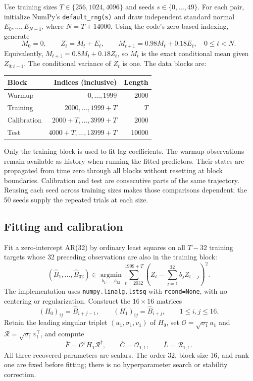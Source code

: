 \documentclass[11pt,twoside]{article}
\theoremstyle{definition}
\theoremstyle{remark}
\begin{document}
Use training sizes \(T\in\{256,1024,4096\}\) and seeds
\(s\in\{0,\ldots,49\}\). For each pair, initialize NumPy's
\texttt{default\_rng(s)} and draw independent standard normal
\(E_0,\ldots,E_{N-1}\), where \(N=T+14000\).
Using the code's zero-based indexing, generate
\[
 M_0=0,\qquad Z_t=M_t+E_t,\qquad
 M_{t+1}=0.98M_t+0.18E_t,\quad 0\le t<N.
\]
Equivalently, \(M_{t+1}=0.8M_t+0.18Z_t\), so \(M_t\) is the
exact conditional mean given \(Z_{0:t-1}\). The conditional variance
of \(Z_t\) is one. The data blocks are:
\begin{center}
\begin{tabular}{lrr}
\toprule
Block & Indices (inclusive) & Length\\
\midrule
Warmup & \(0,\ldots,1999\) & 2000\\
Training & \(2000,\ldots,1999+T\) & \(T\)\\
Calibration & \(2000+T,\ldots,3999+T\) & 2000\\
Test & \(4000+T,\ldots,13999+T\) & 10000\\
\bottomrule
\end{tabular}
\end{center}
Only the training block is used to fit lag coefficients. The warmup
observations remain available as history when running the fitted
predictors. Their states are propagated from time zero through all
blocks without resetting at block boundaries. Calibration and test
are consecutive parts of the same trajectory. Reusing each seed across
training sizes makes those comparisons dependent; the 50 seeds supply
the repeated trials at each size.

\subsection{Fitting and calibration}

Fit a zero-intercept AR(32) by ordinary least squares on all \(T-32\)
training targets whose 32 preceding observations are also in the training
block:
\[
 (\widehat B_1,\ldots,\widehat B_{32})
 \in\operatorname*{argmin}_{b_1,\ldots,b_{32}}
 \sum_{t=2032}^{1999+T}
 \left(Z_t-\sum_{j=1}^{32}b_jZ_{t-j}\right)^2.
\]
The implementation uses \texttt{numpy.linalg.lstsq} with
\texttt{rcond=None}, with no centering or regularization.
Construct the \(16\times16\) matrices
\[
 (H_0)_{ij}=\widehat B_{i+j-1},\qquad
 (H_1)_{ij}=\widehat B_{i+j},\qquad 1\le i,j\le16.
\]
Retain the leading singular triplet \((u_1,\sigma_1,v_1)\) of \(H_0\),
set \(\mathcal O=\sqrt{\sigma_1}u_1\) and
\(\mathcal R=\sqrt{\sigma_1}v_1^\top\), and compute
\[
 \overline F=\mathcal O^\dagger H_1\mathcal R^\dagger,\qquad
 \overline C=\mathcal O_{1,1},\qquad
 \overline L=\mathcal R_{1,1}.
\]
All three recovered parameters are scalars. The order 32, block size 16,
and rank one are fixed before fitting; there is no hyperparameter search
or stability correction.
\end{document}
